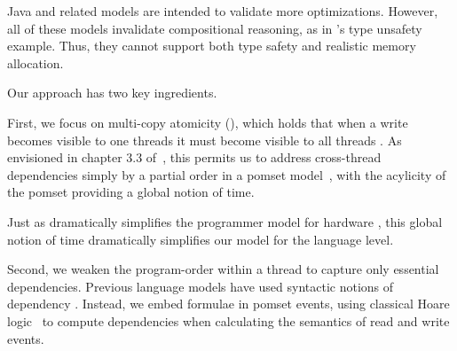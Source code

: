 Java and  related models \citep{Manson:2005:JMM:1047659.1040336,DBLP:conf/esop/JagadeesanPR10,DBLP:conf/popl/KangHLVD17,Chakraborty:2019} are intended to validate more optimizations.  However, all of these models invalidate compositional reasoning, as in \citeauthor{DBLP:journals/toplas/Lochbihler13}'s type unsafety example.  Thus, they cannot support both type safety and realistic memory allocation.


Our approach has two key ingredients.  

First, we focus on multi-copy atomicity (\mca), which holds that when a write becomes visible to one threads it must become visible to all threads  \citep{DBLP:journals/pacmpl/PulteFDFSS18}.  As envisioned in chapter 3.3 of~\citet{AlglaveThesis},  this permits us to address cross-thread dependencies simply by a partial order in a pomset model~\citep{GISCHER1988199,Plotkin:1997:TSP:266557.266600}, with the acylicity of the pomset providing a global notion of time.  

Just as \mca{} dramatically simplifies the programmer model for hardware \citep{DBLP:journals/pacmpl/PulteFDFSS18},
this global notion of time dramatically simplifies our model for the language level.

Second, we weaken the program-order within a thread to capture only essential dependencies.
Previous language models have used syntactic notions of dependency \cite{Batty:2011:MCC:1926385.1926394}.
Instead, we embed formulae in pomset events, using classical
Hoare logic~\citep{Hoare:1969:ABC:363235.363259, gordonHoare} to compute dependencies when calculating the semantics of read and write events. %


